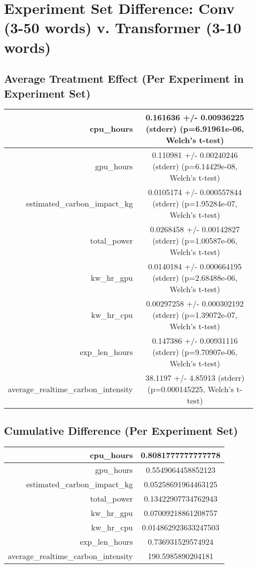\documentclass{article}%
\begin{document}
%
\normalsize%
\section{Experiment Set Difference: Conv (3{-}50 words) v. Transformer (3{-}10 words)}%
\label{sec:Experiment Set Difference Conv (3{-}50 words) v. Transformer (3{-}10 words)}%
\subsection{Average Treatment Effect (Per Experiment in Experiment Set)}%
\label{subsec:Average Treatment Effect (Per Experiment in Experiment Set)}%
\begin{tabular}{|r|c|}%
\hline%
cpu\_hours&0.161636 +/{-} 0.00936225 (stderr) (p=6.91961e{-}06, Welch's t{-}test)\\%
\hline%
gpu\_hours&0.110981 +/{-} 0.00240246 (stderr) (p=6.14429e{-}08, Welch's t{-}test)\\%
\hline%
estimated\_carbon\_impact\_kg&0.0105174 +/{-} 0.000557844 (stderr) (p=1.95284e{-}07, Welch's t{-}test)\\%
\hline%
total\_power&0.0268458 +/{-} 0.00142827 (stderr) (p=1.00587e{-}06, Welch's t{-}test)\\%
\hline%
kw\_hr\_gpu&0.0140184 +/{-} 0.000664195 (stderr) (p=2.68488e{-}06, Welch's t{-}test)\\%
\hline%
kw\_hr\_cpu&0.00297258 +/{-} 0.000302192 (stderr) (p=1.39072e{-}07, Welch's t{-}test)\\%
\hline%
exp\_len\_hours&0.147386 +/{-} 0.00931116 (stderr) (p=9.70907e{-}06, Welch's t{-}test)\\%
\hline%
average\_realtime\_carbon\_intensity&38.1197 +/{-} 4.85913 (stderr) (p=0.000145225, Welch's t{-}test)\\%
\hline%
\end{tabular}

%
\subsection{Cumulative Difference (Per Experiment Set)}%
\label{subsec:Cumulative Difference (Per Experiment Set)}%
\begin{tabular}{|r|c|}%
\hline%
cpu\_hours&0.8081777777777778\\%
\hline%
gpu\_hours&0.5549064458852123\\%
\hline%
estimated\_carbon\_impact\_kg&0.05258691964463125\\%
\hline%
total\_power&0.13422907734762943\\%
\hline%
kw\_hr\_gpu&0.07009218861208757\\%
\hline%
kw\_hr\_cpu&0.014862923633247503\\%
\hline%
exp\_len\_hours&0.736931529574924\\%
\hline%
average\_realtime\_carbon\_intensity&190.5985890204181\\%
\hline%
\end{tabular}

%
\end{document}
